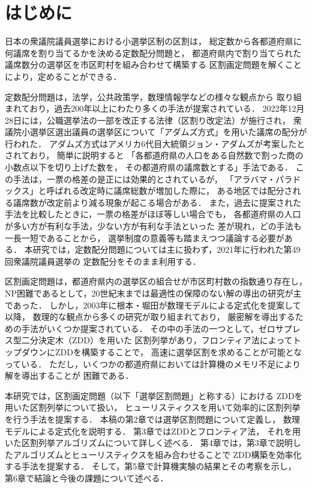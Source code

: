 \chapter{はじめに} \label{chapter:1}
日本の衆議院議員選挙における小選挙区制の区割は，
総定数から各都道府県に何議席を割り当てるかを決める定数配分問題と，
都道府県内で割り当てられた議席数分の選挙区を市区町村を組み合わせて構築する
区割画定問題を解くことにより，定めることができる．

定数配分問題は，法学，公共政策学，数理情報学などの様々な観点から
取り組まれており，過去200年以上にわたり多くの手法が提案されている．
2022年12月28日には，公職選挙法の一部を改正する法律（区割り改定法）が施行され，
衆議院小選挙区選出議員の選挙区について「アダムズ方式」を用いた議席の配分が行われた\cite{ichimori}．
アダムズ方式はアメリカ6代目大統領ジョン・アダムズが考案したとされており，
簡単に説明すると
「各都道府県の人口をある自然数で割った商の小数点以下を切り上げた数を，
その都道府県の議席数とする」手法である．
この手法は，一票の格差の是正には効果的とされているが，
「アラバマ・パラドックス」と呼ばれる改定時に議席総数が増加した際に，
ある地区では配分される議席数が改定前より減る現象が起こる場合がある．
また，過去に提案された手法を比較したときに，一票の格差がほぼ等しい場合でも，
各都道府県の人口が多い方が有利な手法，少ない方が有利な手法といった
差が現れ，どの手法も一長一短であることから，
選挙制度の意義等も踏まえつつ議論する必要がある．
本研究では，定数配分問題については主に扱わず，2021年に行われた第49回衆議院議員選挙の
定数配分をそのまま利用する．

区割画定問題は，都道府県内の選挙区の組合せが市区町村数の指数通り存在し，
NP困難であるとして，20世紀末までは最適性の保障のない解の導出の研究が主であった．
しかし，2003年に根本・堀田が数理モデルによる定式化を提案\cite{nemoto}して以降，
数理的な観点から多くの研究が取り組まれており，
厳密解を導出するための手法がいくつか提案されている．
その中の手法の一つとして，ゼロサプレス型二分決定木（ZDD）を用いた
区割列挙があり，フロンティア法によってトップダウンにZDDを構築することで，
高速に選挙区割を求めることが可能となっている．
ただし，いくつかの都道府県においては計算機のメモリ不足により解を導出することが
困難である．

本研究では，区割画定問題（以下「選挙区割問題」と称する）における
ZDDを用いた区割列挙について扱い，
ヒューリスティクスを用いて効率的に区割列挙を行う手法を提案する．
本稿の第2章では選挙区割問題について定義し，
数理モデルによる定式化を説明する．
第3章ではZDDとフロンティア法，
それを用いた区割列挙アルゴリズムについて詳しく述べる．
第4章では，第3章で説明したアルゴリズムとヒューリスティクスを組み合わせることで
ZDD構築を効率化する手法を提案する．
そして，第5章で計算機実験の結果とその考察を示し，
第6章で結論と今後の課題について述べる．
